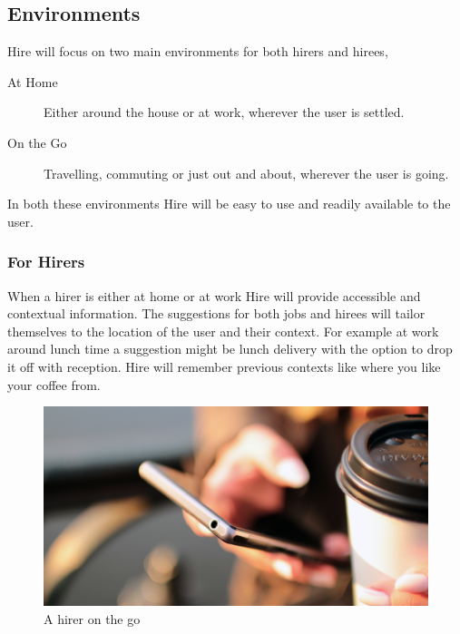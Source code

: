 \documentclass[11pt]{article}
\begin{document}
\subsection{Environments}



Hire will focus on two main environments for both hirers and hirees,

\begin{description}
    \item[At Home] Either around the house or at work, wherever the user is settled.
    \item[On the Go] Travelling, commuting or just out and about, wherever the user is going.
\end{description}

In both these environments Hire will be easy to use and readily available to the user.

\subsubsection{For Hirers}

When a hirer is either at home or at work Hire will provide accessible and contextual information. The suggestions for both jobs and hirees will tailor themselves to the location of the user and their context. For example at work around lunch time a suggestion might be lunch delivery with the option to drop it off with reception. Hire will remember previous contexts like where you like your coffee from.


\begin{figure}[htb]
\begin{center}
\hspace*{-4cm}
\includegraphics[width=1.5\textwidth]{Img/hands-coffee-smartphone-technology}
\end{center}
\caption{A hirer on the go}
\end{figure}
\end{document}
